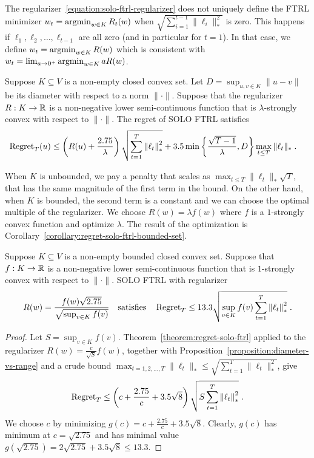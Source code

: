 The regularizer~\eqref{equation:solo-ftrl-regularizer} does not uniquely define
the \textsc{FTRL} minimizer $w_t = \operatorname*{argmin}_{w \in K} R_t(w)$ when
$\sqrt{\sum_{i=1}^{t-1} \|\ell_i\|_*^2}$ is zero. This happens if $\ell_1,
\ell_2, \dots, \ell_{t-1}$ are all zero (and in particular for $t=1$).  In that
case, we define $w_t = \operatorname*{argmin}_{w \in K} R(w)$ which is consistent with
$w_t = \lim_{a \to 0^+}  \operatorname*{argmin}_{w \in K} a R(w)$.

\begin{theorem}
\label{theorem:regret-solo-ftrl}
Suppose $K \subseteq V$ is a non-empty closed convex set.  Let $D = \sup_{u,v
\in K} \|u - v\|$ be its diameter with respect to a norm $\|\cdot\|$.  Suppose
that the regularizer $R:K \to \mathbb{R}$ is a non-negative lower semi-continuous
function that is $\lambda$-strongly convex with respect to $\|\cdot\|$. The
regret of \textsc{SOLO FTRL} satisfies
\begin{align*}
\operatorname{Regret}_T(u)
& \le \left( R(u) + \frac{2.75}{\lambda}\right) \sqrt{\sum_{t=1}^{T} {\left\|{\ell_t}\right\|}_*^2}
+ 3.5 \min\left\{\frac{\sqrt{T-1}}{\lambda} , D\right\} \max_{t \le T} \|\ell_t\|_* \; .
\end{align*}
\end{theorem}

When $K$ is unbounded, we pay a penalty that scales as $\max_{t \le T}
\|\ell_t\|_* \sqrt{T}$, that has the same magnitude of the first term in the
bound. On the other hand, when $K$ is bounded, the second term is a constant and
we can choose the optimal multiple of the regularizer.  We choose $R(w) =
\lambda f(w)$ where $f$ is a $1$-strongly convex function and optimize
$\lambda$.  The result of the optimization is
Corollary~\ref{corollary:regret-solo-ftrl-bounded-set}.

\begin{corollary}
\label{corollary:regret-solo-ftrl-bounded-set}
Suppose $K \subseteq V$ is a non-empty bounded closed convex set.  Suppose that
$f:K \to \mathbb{R}$ is a non-negative lower semi-continuous function that is
$1$-strongly convex with respect to $\|\cdot\|$. \textsc{SOLO FTRL} with
regularizer
$$
R(w) = \frac{f(w)\sqrt{2.75}}{\sqrt{\sup_{v \in K} f(v)}}
\quad \text{satisfies} \quad
\operatorname{Regret}_T \le 13.3 \sqrt{\sup_{v \in K} f(v) \sum_{t=1}^{T} {\left\|{\ell_t}\right\|}_*^2} \; .
$$
\end{corollary}
%
\begin{proof}
Let $S = \sup_{v \in K} f(v)$. Theorem~\ref{theorem:regret-solo-ftrl} applied
to the regularizer $R(w) = \frac{c}{\sqrt{S}} f(w)$, together with
Proposition~\ref{proposition:diameter-vs-range} and a crude bound
$\max_{t=1,2,\dots,T} \|\ell_t\|_* \le \sqrt{\sum_{t=1}^T \|\ell_t\|_*^2}$,
give
$$
\operatorname{Regret}_T \le \left(c + \frac{2.75}{c}  + 3.5\sqrt{8} \right) \sqrt{S \sum_{t=1}^{T} {\left\|{\ell_t}\right\|}_*^2} \; .
$$
We choose $c$ by minimizing $g(c) = c + \frac{2.75}{c} + 3.5\sqrt{8}$. Clearly,
$g(c)$ has minimum at $c = \sqrt{2.75}$ and has minimal value $g(\sqrt{2.75}) =
2\sqrt{2.75} + 3.5\sqrt{8} \le 13.3$.
\end{proof}


